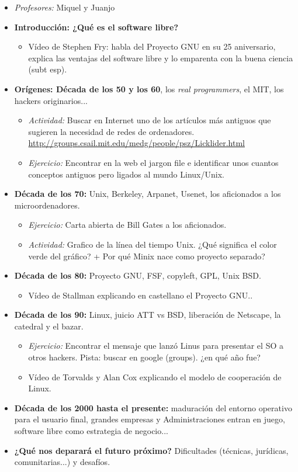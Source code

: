 \documentclass[a4paper,12pt]{article}
\begin{document}
\begin{itemize}
\item \textit{Profesores:} Miquel y Juanjo
\item \textbf{Introducción: ¿Qué es el software libre?} 
	\begin{itemize}
	\item Vídeo de Stephen Fry: habla del Proyecto GNU en su 25 aniversario, explica las ventajas del software libre y lo emparenta con la buena ciencia (subt esp). 
	\end{itemize}
\item \textbf{Orígenes: Década de los 50 y los 60}, los \textit{real programmers}, el MIT, los hackers originarios...
	\begin{itemize}
	\item \textit{Actividad:} Buscar en Internet uno de los artículos más antiguos que sugieren la necesidad de redes de ordenadores. \url{http://groups.csail.mit.edu/medg/people/psz/Licklider.html}
	\item \textit{Ejercicio:} Encontrar en la web el jargon file e identificar unos cuantos conceptos antiguos pero ligados al mundo Linux/Unix. 
	\end{itemize}
\item \textbf{Década de los 70:} Unix, Berkeley, Arpanet, Usenet, los aficionados a los microordenadores.
	\begin{itemize}
	\item \textit{Ejercicio:} Carta abierta de Bill Gates a los aficionados.
	\item \textit{Actividad:} Grafico de la línea del tiempo Unix. ¿Qué significa el color verde del gráfico? + Por qué Minix nace como proyecto separado?
	\end{itemize}
\item \textbf{Década de los 80:} Proyecto GNU, FSF, copyleft, GPL, Unix BSD.
	\begin{itemize}
	\item Vídeo de Stallman explicando en castellano el Proyecto GNU.. 
	\end{itemize}
\item \textbf{Década de los 90:} Linux, juicio ATT vs BSD, liberación de Netscape, la catedral y el bazar.
	\begin{itemize}
	\item \textit{Ejercicio:} Encontrar el mensaje que lanzó Linus para presentar el SO a otros hackers. Pista: buscar en google (groups). ¿en qué año fue?
	\item Vídeo de Torvalds y Alan Cox explicando el modelo de cooperación de Linux. 
	\end{itemize}
\item \textbf{Década de los 2000 hasta el presente:} maduración del entorno operativo para el usuario final, grandes empresas y Administraciones entran en juego, software libre como estrategia de negocio...
\item \textbf{¿Qué nos deparará el futuro próximo?} Dificultades (técnicas, jurídicas, comunitarias...) y desafíos.
\end{itemize}
\end{document}
